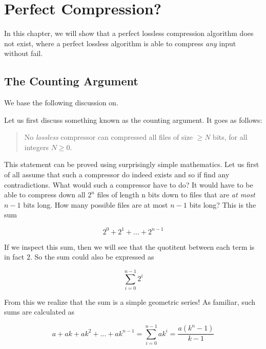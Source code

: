 \begin{comment}
  
\end{comment}

\chapter{Perfect Compression?}
\label{cha:perfect}

In this chapter, we will show that a perfect lossless compression algorithm does
not exist, where a perfect lossless algorithm is able to compress
\textit{any} input without fail.

\section{The Counting Argument}

We base the following discussion on\cite{Salomon:2004:DCC,jean-loup-comp-faq}.

Let us first discuss something known as the counting argument. It goes
as follows:

\begin{quote}
  No \textit{lossless} compressor can compressed all files of size
  $\ge N$ bits, for all integers $N \ge 0$.
\end{quote}

This statement can be proved using surprisingly simple
mathematics. Let us first of all assume that such a compressor do
indeed exists and so if find any contradictions. What would such a
compressor have to do? It would have to be able to compress down all
$2^n$ files of length n bits down to files that are \textit{at most}
$n-1$ bits long. How many possible files are at most $n-1$ bits long?
This is the sum

\begin{equation}
  \label{eq:n-minus-one}
  2^0 + 2^1 + \ldots + 2^{n-1}
\end{equation}

If we inspect this sum, then we will see that the quotitent between
each term is in fact $2$. So the sum could also be expressed as

\begin{equation*}
  \sum^{n-1}_{i = 0} 2^{i}
\end{equation*}

From this we realize that the sum is a simple geometric series! As
familiar, such sums are calculated as

\begin{equation}
  \label{eq:geometric-series}
  a + ak + ak^2 + \ldots + ak^{n-1} = \sum^{n-1}_{i = 0} ak^{i} =
  \frac{a(k^n - 1)}{k -1}
\end{equation}

